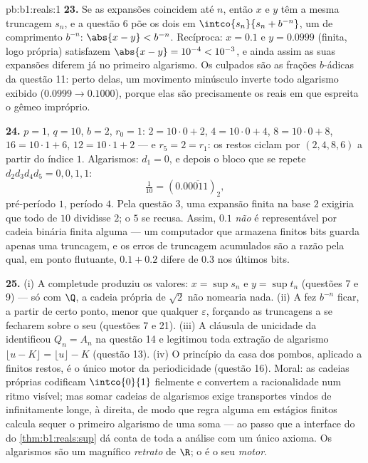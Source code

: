 \begin{solution}{pb:b1:reals:1}
\textbf{23.} Se as expansões coincidem até $n$, então $x$ e $y$
têm a mesma truncagem $s_n$, e a questão 6 põe os dois em
$\intco{s_n}{s_n + b^{-n}}$, um  de comprimento $b^{-n}$:
$\abs{x - y} < b^{-n}$. Recíproca: $x = 0.1$ e $y = 0.0999$
(finita, logo própria) satisfazem $\abs{x - y} = 10^{-4} <
10^{-3}$, e ainda assim as suas expansões diferem já no primeiro
algarismo. Os culpados são as frações $b$-ádicas da questão 11: perto
delas, um movimento minúsculo inverte todo algarismo exibido ($0.0999 \to
0.1000$), porque elas são precisamente os reais em que
espreita o gêmeo impróprio.

\textbf{24.} $p = 1$, $q = 10$, $b = 2$, $r_0 = 1$: $2 = 10 \cdot
0 + 2$, $4 = 10 \cdot 0 + 4$, $8 = 10 \cdot 0 + 8$, $16 = 10
\cdot 1 + 6$, $12 = 10 \cdot 1 + 2$ --- e $r_5 = 2 = r_1$: os
restos ciclam por $(2, 4, 8, 6)$ a partir do índice $1$. Algarismos: $d_1 =
0$, e depois o bloco que se repete $d_2 d_3 d_4 d_5 = 0, 0, 1, 1$:
\[
\tfrac{1}{10} = (0.0\overline{0011})_2 ,
\]
pré-período $1$, período $4$. Pela questão 3, uma expansão finita na
base $2$ exigiria que todo  de $10$ dividisse $2$; o 
$5$ se recusa. Assim, $0.1$ \emph{não} é representável por cadeia
binária finita alguma --- um computador que armazena finitos bits guarda
apenas uma truncagem, e os erros de truncagem acumulados são a razão
pela qual, em ponto flutuante, $0.1 + 0.2$ difere de $0.3$ nos últimos bits.

\textbf{25.} (i) A completude produziu os valores: $x = \sup s_n$
e $y = \sup t_n$ (questões 7 e 9) --- só com $\Q$, a
cadeia própria de $\sqrt 2$ não nomearia nada. (ii) A
 fez $b^{-n}$ ficar, a partir de certo ponto,
menor que qualquer $\varepsilon$, forçando as truncagens a se fecharem sobre
o seu  (questões 7 e 21). (iii) A cláusula de unicidade da
 identificou $Q_n = A_n$ na questão 14 e legitimou toda
extração de algarismo $\lfloor u - K \rfloor = \lfloor u \rfloor - K$
(questão 13). (iv) O princípio da casa dos pombos, aplicado a finitos
restos, é o único motor da periodicidade (questão 16).
Moral: as cadeias próprias codificam $\intco{0}{1}$ fielmente e convertem
a racionalidade num ritmo visível; mas somar cadeias de algarismos
exige transportes vindos de infinitamente longe, à direita, de modo que
regra alguma em estágios finitos calcula sequer o primeiro algarismo de
uma soma --- ao passo que a interface do  do \cref{thm:b1:reals:sup} dá
conta de toda a análise com um único axioma. Os algarismos são um
magnífico \emph{retrato} de $\R$; o  é o seu \emph{motor}.
\end{solution}
